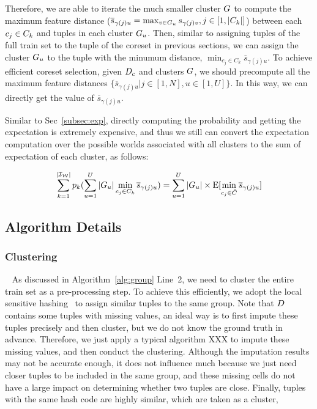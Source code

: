 Therefore,  we are able to iterate the much smaller cluster $G$ to compute  the maximum feature distance (\ie $\overline{s}_{\gamma(j)u} = \max_{v \in G_u}s_{\gamma(j)v}, j \in [1,|C_k|]$) between each $c_j \in C_k$ and tuples in each cluster $G_u$. Then, similar to assigning tuples of the full train set to the tuple of the coreset in previous sections, we can assign the cluster $G_u$ to the tuple  with the minumum distance, \ie $\min_{c_j\in C_k} \overline{s}_{\gamma(j)u}$. To achieve efficient coreset selection, given $D_c$ and clusters $G$, we should precompute all the maximum feature distances $\{\overline{s}_{\gamma(j)u}|j \in [1,N], u \in [1,U]\}$. In this way, we can directly get the value of $\overline{s}_{\gamma(j)u}$.

Similar to Sec~\ref{subsec:exp}, directly computing the probability and getting the expectation is extremely expensive, and thus we still can convert the expectation computation over the possible worlds associated with all clusters to the sum of expectation of each cluster, as follows:

\begin{equation}\label{eqa:cluster-4}
    \begin{aligned}
        \sum_{k= 1}^{|\mathcal{I_W}|} p_k (\sum_{u=1}^U |G_u| \min_{c_j\in C_k} \overline{s}_{\gamma(j)u}) = \sum_{u=1}^U  |G_u| \times\mathrm{E}[\min_{c_j\in \hat{C}}\overline{s}_{\gamma(j)u}]
    \end{aligned}
\end{equation}

\subsection{Algorithm Details}

\vspace{.5em}

\subsubsection{Clustering}~\label{subsec:clustering}
As discussed in Algorithm~\ref{alg:group} Line~2, we need to cluster the entire train set as a pre-processing step. To achieve this efficiently, we adopt the local sensitive hashing~\cite{} to assign similar tuples to the same group. 
%
Note that $D$ contains some tuples with missing values, an ideal way is to first impute these tuples precisely and then cluster, but we do not know the ground truth in advance. Therefore, we just apply a typical algorithm \ie XXX to impute these missing values, and then conduct the clustering. Although the imputation results may  not be accurate enough, it does not influence much because we just need closer tuples to be included in the same group, and these missing cells do not have a large impact on determining whether two tuples are close. 
%
Finally, tuples with the same hash code are highly similar, which are taken as a cluster,
%
 


